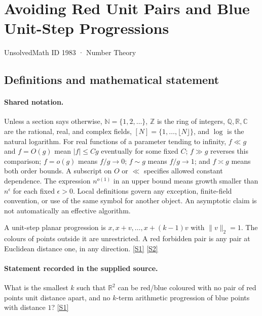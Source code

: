 \documentclass[11pt,a4paper]{article}
\newcommand{\N}{\mathbb{N}}
\newcommand{\Z}{\mathbb{Z}}
\newcommand{\Q}{\mathbb{Q}}
\newcommand{\R}{\mathbb{R}}
\newcommand{\C}{\mathbb{C}}
\newcommand{\sref}[2]{\hyperlink{source:#1:#2}{[S#2]}}
\begin{document}

\setcounter{section}{1982}

\section{Avoiding Red Unit Pairs and Blue Unit-Step Progressions}\label{1983}

{\small\sffamily UnsolvedMath ID 1983 · Number Theory}

\subsection{Definitions and mathematical statement}

\paragraph{Shared notation.}Unless a section says otherwise, $\N=\{1,2,\ldots\}$,
$\Z$ is the ring of integers, $\Q,\R,\C$ are the rational, real, and complex
fields, $[N]=\{1,\ldots,\lfloor N\rfloor\}$, and $\log$ is the natural
logarithm. For real functions of a parameter tending to infinity,
$f\ll g$ and $f=O(g)$ mean $|f|\leq Cg$ eventually for some fixed $C$;
$f\gg g$ reverses this comparison; $f=o(g)$ means $f/g\to0$;
$f\sim g$ means $f/g\to1$; and $f\asymp g$ means both order bounds.
A subscript on $O$ or $\ll$ specifies allowed constant dependence.
The expression $n^{o(1)}$ in an upper bound means growth smaller than
$n^\epsilon$ for each fixed $\epsilon>0$. Local definitions govern any
exception, finite-field convention, or use of the same symbol for another
object. An asymptotic claim is not automatically an effective algorithm.



A unit-step planar progression is $x,x+v,\ldots,x+(k-1)v$ with $\|v\|_2=1$. The colours of points outside it are unrestricted. A red forbidden pair is any pair at Euclidean distance one, in any direction. \sref{1983}{1} \sref{1983}{2}

\paragraph{Statement recorded in the supplied source.}
What is the smallest $k$ such that $\mathbb{R}^2$ can be red/blue coloured with no pair of red points unit distance apart, and no $k$-term arithmetic progression of blue points with distance $1$? \sref{1983}{1}
\end{document}
